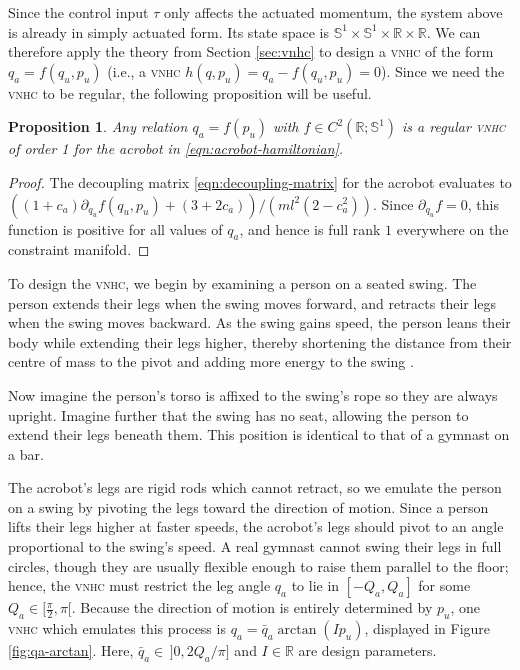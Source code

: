 \documentclass[journal,twoside,web, twocolumn]{ieeecolor}
\newtheorem{prop}{Proposition} %
\newcommand*{\R}{\mathbb{R}}
\renewcommand*{\Re}{\mathbb{R}}
\newcommand*{\Sone}{\mathbb{S}^1}
\newcommand*{\vnhc}{\textsc{vnhc}\xspace}
\begin{document}
Since the control input \(\tau\) only affects the actuated momentum,
the system above is already in simply actuated form.
Its state space is \(\Sone \times \Sone \times \Re \times \Re\).
We can therefore apply the theory from Section \ref{sec:vnhc} to design
a \vnhc of the form \(q_a = f(q_u,p_u)\) (i.e., a \vnhc 
\(h(q,p_u) = q_a - f(q_u,p_u) = 0\)).
Since we need the \vnhc to be regular, the following proposition will be
useful.
\begin{prop}\label{prop:acrobot-fpu-regular}
    Any relation \(q_a = f(p_u)\) 
    with \(f \in C^2\left(\R; \Sone\right)\) is a regular
    \vnhc of order 1 for the acrobot in \eqref{eqn:acrobot-hamiltonian}.
\end{prop}
\begin{proof}
    The decoupling matrix \eqref{eqn:decoupling-matrix} for the acrobot
    evaluates to
    \(((1+c_a)\partial_{q_u}f(q_u,p_u) + (3+2c_a))/(ml^2(2-c_a^2))\).
    Since \(\partial_{q_u} f = 0\), this function is positive for all values
    of \(q_a\), and hence is full rank \(1\) everywhere on the constraint manifold.
\end{proof}

To design the \vnhc, we begin by examining a person on a
seated swing.
The person extends their legs when the swing moves forward, and retracts their
legs when the swing moves backward.
As the swing gains speed, the person leans their body while
extending their legs higher, thereby shortening the distance
from their centre of mass to the pivot and adding more energy to the swing
\cite{how_to_pump_a_swing}.

Now imagine the person's torso is affixed to the swing's rope so they are
always upright. 
Imagine further that the swing has no seat, allowing the person to extend
their legs beneath them. 
This position is identical to that of a gymnast on a bar.

The acrobot's legs are rigid rods which cannot retract, so we emulate the person
on a swing by pivoting the legs toward the direction of motion. 
Since a person lifts their legs higher at faster speeds, the acrobot's legs should
pivot to an angle proportional to the swing's speed.
A real gymnast cannot swing their legs in full circles, though they
are usually flexible enough to raise them parallel to the floor;
hence, the \vnhc must restrict the leg angle \(q_a\) 
to lie in \([-Q_a, Q_a]\) for some \(Q_a \in [\frac{\pi}{2}, \pi[\). 
Because the direction of motion is entirely determined by \(p_u\), 
one \vnhc which emulates this process is \(q_a = \bar{q}_a\arctan( I p_u)\),
displayed in Figure \ref{fig:qa-arctan}.
Here, \(\bar{q}_a \in \, ]0,2 Q_a/\pi]\) and \(I \in \R\) are 
design parameters.
\end{document}

